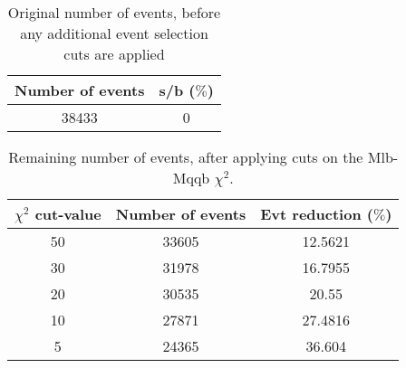 \documentclass{article}
\begin{document}
 

 \begin{abstract} 
 
   The tables in this document represent the influence of the additional event selection cuts that were applied in order to reduce the number of selected events for CPU reasons. \\ 
   The considered cuts are rather basic and are merely developed to reduce the number of so-called wrong events \\ 
   \begin{itemize} 
     \item Cut on Mlb-Mqqb $\chi^{2}$ distribution 
     \item Cut on top and W-mass window 
   \end{itemize} 
 
   \textbf{Created on :} \today 
 \end{abstract} 
 
 \begin{table}[h!t] 
  \caption{Original number of events, before any additional event selection cuts are applied} 
  \centering 
   \begin{tabular}{c|c} 
     Number of events    & s/b ($\%$)     \\ 
     \hline
     38433  & 0 
 
   \end{tabular} 
 \end{table} 
 
 \begin{table}[h!t] 
  \caption{Remaining number of events, after applying cuts on the Mlb-Mqqb $\chi^{2}$.} 
  \centering 
   \begin{tabular}{c|c|c|} 
     $\chi^{2}$ cut-value    & Number of events  & Evt reduction ($\%$)    \\ 
     \hline
     50  &   33605  &  12.5621 \\ 
     30  &   31978  &  16.7955 \\ 
     20  &   30535  &  20.55 \\ 
     10  &   27871  &  27.4816 \\ 
     5  &   24365  &  36.604 \\ 
   \end{tabular} 
 \end{table} 
 
\end{document}
